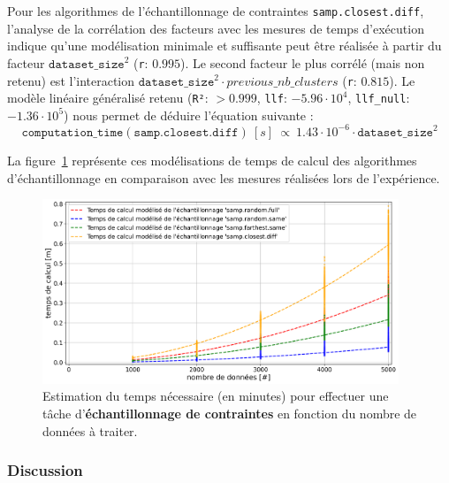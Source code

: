 			Pour les algorithmes de l'échantillonnage de contraintes \texttt{samp.closest.diff}, l'analyse de la corrélation des facteurs avec les mesures de temps d'exécution indique qu'une modélisation minimale et suffisante peut être réalisée à partir du facteur $\texttt{dataset\_size}^{2}$ (\texttt{r}: $0.995$).
			Le second facteur le plus corrélé (mais non retenu) est l'interaction $\texttt{dataset\_size}^{2} \cdot previous\_nb\_clusters$ (\texttt{r}: $0.815$).
			Le modèle linéaire généralisé retenu (\texttt{R²}: $> 0.999$, \texttt{llf}: $-5.96 \cdot 10^{4}$, \texttt{llf\_null}: $-1.36 \cdot 10^{5}$) nous permet de déduire l'équation suivante :
			\begin{equation}
				\texttt{computation\_time}(\texttt{samp.closest.diff})~[s]~
				\propto~1.43 \cdot 10^{-6} \cdot \texttt{dataset\_size}^{2}
			\end{equation}
			
			La figure~\ref{figure:4.3.2-ETUDE-COUTS-TEMPS-CALCUL-MODELISATION-SAMPLING} représente ces modélisations de temps de calcul des algorithmes d'échantillonnage en comparaison avec les mesures réalisées lors de l'expérience.
			\newline
			\begin{figure}[!htb]
				\centering
				\includegraphics[width=0.95\textwidth]{figures/etude-temps-calcul-modelisation-4samp}
				\caption{Estimation du temps nécessaire (en minutes) pour effectuer une tâche d'\textbf{échantillonnage de contraintes} en fonction du nombre de données à traiter.}
				\label{figure:4.3.2-ETUDE-COUTS-TEMPS-CALCUL-MODELISATION-SAMPLING}
			\end{figure}

		\subsubsection{Discussion}
		
